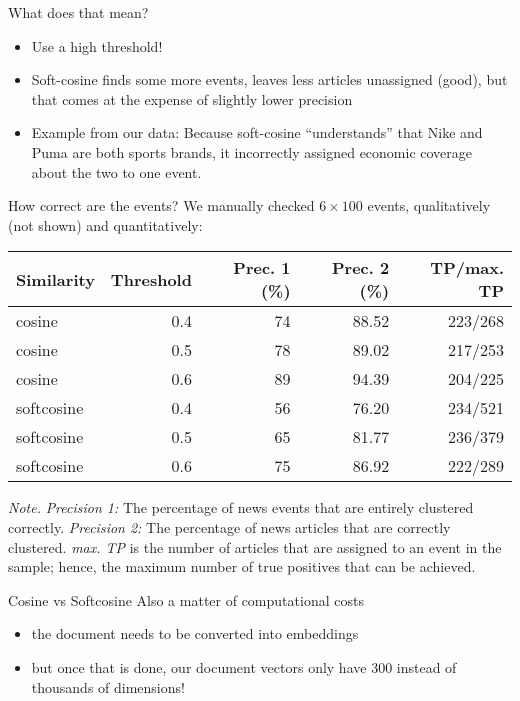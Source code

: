 \begin{frame}{What does that mean?}
  \begin{itemize}
  \item Use a high threshold!
  \item Soft-cosine finds some more events, leaves less articles unassigned (good), but that comes at the expense of slightly lower precision
  \item Example from our data: Because soft-cosine ``understands'' that Nike and Puma are both sports brands, it incorrectly assigned economic coverage about the two to one event.
  \end{itemize}
\end{frame}




\begin{frame}[fragile]{How correct are the events?}
  We manually checked $6 \times 100$ events, qualitatively (not shown) and quantitatively:
  \begin{table}
    \begin{tabular}{lrrrr}
      \footnotesize
      \textbf{Similarity}   & \textbf{Threshold} & \textbf{Prec. 1 (\%)} & \textbf{Prec. 2 (\%)} &\textbf{TP/max. TP}  \\
      \midrule
      cosine              & 0.4       & 74        & 88.52     & 223/268 \\
      cosine              & 0.5       & 78        & 89.02     & 217/253 \\
      cosine              & 0.6       & 89        & 94.39     & 204/225 \\
      softcosine          & 0.4       & 56        & 76.20     & 234/521 \\
      softcosine          & 0.5       & 65        & 81.77     & 236/379 \\
      softcosine          & 0.6       & 75        & 86.92     & 222/289 \\
      
    \end{tabular}
	\end{table}
	\tiny 
	\textit{Note.} \textit{Precision 1:} The percentage of news events that are entirely clustered correctly. \textit{Precision 2:} The percentage of news articles that are correctly clustered. \textit{max. TP} is the number of articles that are assigned to an event in the sample; hence, the maximum number of true positives that can be achieved.\\
	
\end{frame}

\begin{frame}{Cosine vs Softcosine}
	Also a matter of computational costs
	\begin{itemize}
	\item the document needs to be converted into embeddings
	\item but once that is done, our document vectors only have 300 instead of thousands of dimensions!
	\end{itemize}
\end{frame}


